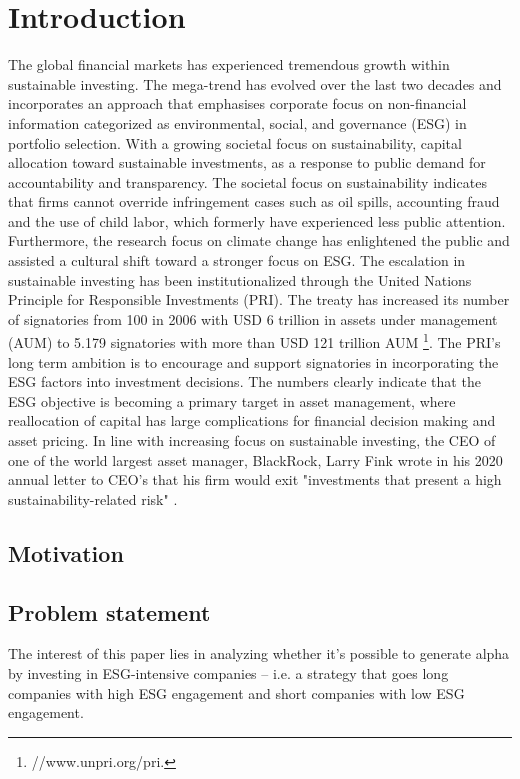 \section{Introduction} \label{sec:intro}
The global financial markets has experienced tremendous growth within sustainable investing. The mega-trend has evolved over the last two decades and incorporates an approach that emphasises corporate focus on non-financial information categorized as environmental, social, and governance (ESG) in portfolio selection. With a growing societal focus on sustainability, capital allocation toward sustainable investments, as a response to public demand for accountability and transparency. The societal focus on sustainability indicates that firms cannot override infringement cases such as oil spills, accounting fraud and the use of child labor, which formerly have experienced less public attention. Furthermore, the research focus on climate change has enlightened the public and assisted a cultural shift toward a stronger focus on ESG. The escalation in sustainable investing has been institutionalized through the United Nations Principle for Responsible Investments (PRI). The treaty has increased its number of signatories from 100 in 2006 with USD 6 trillion in assets under management (AUM) to 5.179 signatories with more than USD 121 trillion AUM \footnote{//www.unpri.org/pri.}. 
The PRI's long term ambition is to encourage and support signatories in incorporating the ESG factors into investment decisions.
The numbers clearly indicate that the ESG objective is becoming a primary target in asset management, where reallocation of capital has large complications for financial decision making and asset pricing. In line with increasing focus on sustainable investing, the CEO of one of the world largest asset manager, BlackRock, Larry Fink wrote in his 2020 annual letter to CEO's that his firm would exit "investments that present a high sustainability-related risk" \citep{Blackrock}. 



\subsection{Motivation}

\subsection{Problem statement}

The interest of this paper lies in analyzing whether it’s possible to generate alpha by investing in ESG-intensive companies – i.e.
a strategy that goes long companies with high ESG engagement and short companies with low ESG engagement. 

